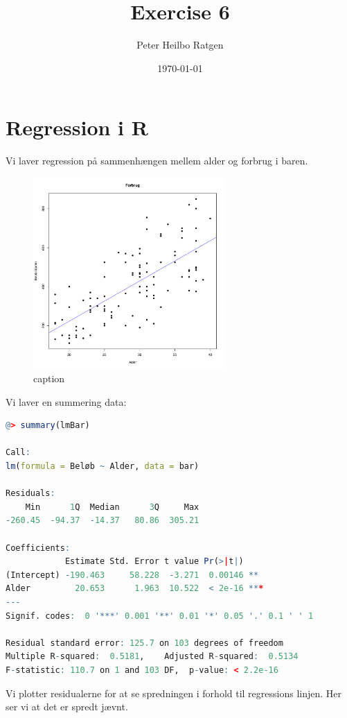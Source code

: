 \documentclass{article}
\title{Exercise 6}
\author{Peter Heilbo Ratgen}
\date{\today}
\begin{document}
\maketitle
\section{Regression i R}
Vi laver regression på sammenhængen mellem alder og forbrug i baren.

\begin{figure}[h]
  \centering
  \includegraphics[width=0.65\textwidth]{../abline.pdf}
  \caption{caption}
\end{figure}

Vi laver en summering data:
\begin{lstlisting}[inputencoding=utf8/latin1,basicstyle=\ttfamily, language=R, keywordstyle=\color{blue}\bfseries, rulecolor=\color{black}]
@> summary(lmBar)

Call:
lm(formula = Beløb ~ Alder, data = bar)

Residuals:
    Min      1Q  Median      3Q     Max
-260.45  -94.37  -14.37   80.86  305.21

Coefficients:
            Estimate Std. Error t value Pr(>|t|)
(Intercept) -190.463     58.228  -3.271  0.00146 **
Alder         20.653      1.963  10.522  < 2e-16 ***
---
Signif. codes:  0 '***' 0.001 '**' 0.01 '*' 0.05 '.' 0.1 ' ' 1

Residual standard error: 125.7 on 103 degrees of freedom
Multiple R-squared:  0.5181,    Adjusted R-squared:  0.5134
F-statistic: 110.7 on 1 and 103 DF,  p-value: < 2.2e-16
\end{lstlisting}

Vi plotter residualerne for at se spredningen i forhold til regressions linjen.
Her ser vi at det er spredt jævnt.
\end{document}
